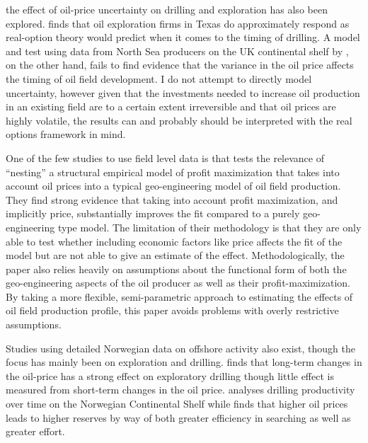 \documentclass[12pt]{scrartcl} %
\begin{document}
the effect of oil-price uncertainty on drilling and exploration has also been explored.  \citet{kellogg_effect_2010} finds that oil exploration firms in Texas do approximately respond as real-option theory would predict when it comes to the timing of drilling.  A model and test using data from North Sea producers on the UK continental shelf by \citet{hurn_geology_1994}, on the other hand, fails to find evidence that the variance in the oil price affects the timing of oil field development.  I do not attempt to directly model uncertainty, however given that the investments needed to increase oil production in an existing field are to a certain extent irreversible and that oil prices are highly volatile, the results can and probably should be interpreted with the real options framework in mind.  

One of the few studies to use field level data is \citet{black_is_1998} that tests the relevance of “nesting” a structural empirical model of profit maximization that takes into account oil prices into a typical geo-engineering model of oil field production.  They find strong evidence that taking into account profit maximization, and implicitly price, substantially improves the fit compared to a purely geo-engineering type model.   The limitation of their methodology is that they are only able to test whether including economic factors like price affects the fit of the model but are not able to give an estimate of the effect.  Methodologically, the paper also relies heavily on assumptions about the functional form of both the geo-engineering aspects of the oil producer as well as their profit-maximization.  By taking a more flexible, semi-parametric approach to estimating the effects of oil field production profile, this paper avoids problems with overly restrictive assumptions.  

Studies using detailed Norwegian data on offshore activity also exist, though the focus has mainly been on exploration and drilling.  \citet{mohn_exploration_2008} finds that long-term changes in the oil-price has a strong effect on exploratory drilling though little effect is measured from short-term changes in the oil price.  \citet{osmundsen_exploration_2010} analyses drilling productivity over time on the Norwegian Continental Shelf while \citet{mohn_efforts_2008} finds that higher oil prices leads to higher reserves by way of both greater efficiency in searching as well as greater effort.  
\end{document}
